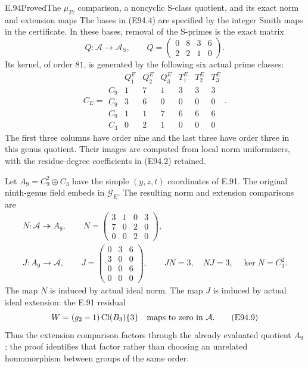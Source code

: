 \begin{statement}{E.94}{Proved}{The \(\mu_{27}\) comparison, a noncyclic S-class quotient, and its exact norm and extension maps}
The bases in (E94.4) are specified by the integer
Smith maps in the certificate. In these bases, removal
of the S-primes is the exact matrix
\[
 Q:\mathcal A\longrightarrow\mathcal A_S,\qquad
 Q=\begin{pmatrix}
 0&8&3&6\\
 2&2&1&0
 \end{pmatrix}.
 \tag{E94.6}
\]
Its kernel, of order \(81\), is generated by the
following six actual prime classes:
\[
 C_E=
 \begin{array}{c|rrrrrr}
 &Q_1^E&Q_2^E&Q_3^E&T_1^E&T_2^E&T_3^E\\ \hline
 C_9&1&7&1&3&3&3\\
 C_9&3&6&0&0&0&0\\
 C_9&1&1&7&6&6&6\\
 C_3&0&2&1&0&0&0
 \end{array}.
 \tag{E94.7}
\]
The first three columns have order nine and the
last three have order three in this genus quotient.
Their images are computed from local norm
uniformizers, with the residue-degree coefficients
in (E94.2) retained.

Let \(A_9=C_9^2\oplus C_3\) have the simple
\((y,z,t)\) coordinates of E.91. The original
ninth-genus field embeds in \(\mathcal G_E\).
The resulting norm and extension comparisons are
\[
 \begin{gathered}
 N:\mathcal A\twoheadrightarrow A_9,\qquad
 N=\begin{pmatrix}
 3&1&0&3\\
 7&0&2&0\\
 0&0&2&0
 \end{pmatrix},\\[2mm]
 J:A_9\longrightarrow\mathcal A,\qquad
 J=\begin{pmatrix}
 0&3&6\\
 3&0&0\\
 0&0&6\\
 0&0&0
 \end{pmatrix},\qquad
 JN=3,\quad NJ=3,\quad \ker N=C_3^2 .
 \end{gathered}
 \tag{E94.8}
\]
The map \(N\) is induced by actual ideal norm.
The map \(J\) is induced by actual ideal extension:
the E.91 residual
\[
 W=(g_2-1)\operatorname{Cl}(B_3)\{3\}
 \quad\hbox{maps to zero in }\mathcal A .
 \tag{E94.9}
\]
Thus the extension comparison factors through
the already evaluated quotient \(A_9\); the proof
identifies that factor rather than choosing an
unrelated homomorphism between groups of the same order.


\end{statement}
